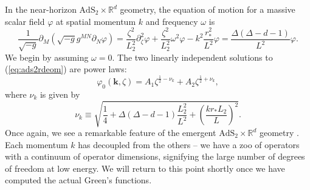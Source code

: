 \documentclass[10pt, oneside]{book}
\begin{document}
\begin{doublespace}
In the near-horizon $\mathrm{AdS}_2 \times \mathbb{R}^d$ geometry, the equation of motion for a massive scalar field $\varphi$ at spatial momentum $k$ and frequency $\omega$ is \begin{equation}
\frac{1}{\sqrt{-g}}\partial_M \left(\sqrt{-g}g^{MN} \partial_N\varphi\right) = \frac{\zeta^2}{L_2^2} \partial_\zeta^2 \varphi + \frac{\zeta^2}{L_2^2} \omega^2 \varphi - k^2 \frac{r_*^2}{L^2}\varphi = \frac{\Delta(\Delta-d-1)}{L^2}\varphi.  \label{eq:ads2rdeom}
\end{equation}
We begin by assuming $\omega=0$.   The two linearly independent solutions to (\ref{eq:ads2rdeom}) are power laws: \begin{equation}
\varphi_0(\mathbf{k},\zeta) = A_1 \zeta^{\frac{1}{2}-\nu_k} + A_2\zeta^{\frac{1}{2}+\nu_k},\label{eq:varphi0zeta}
\end{equation}
where $\nu_k$ is given by
\begin{equation}
\nu_k \equiv \sqrt{\frac{1}{4} + \Delta(\Delta-d-1)\frac{L_2^2}{L^2} + \left(\frac{kr_*L_2}{L}\right)^2 }.   \label{eq:nuk}
\end{equation}
Once again, we see a remarkable feature of the emergent $\mathrm{AdS}_2\times\mathbb{R}^d$ geometry  \cite{Faulkner:2009wj}.   Each momentum $k$ has decoupled from the others --  we have a zoo of operators with a continuum of operator dimensions, signifying the large number of degrees of freedom at low energy.  We will return to this point shortly once we have computed the actual Green's functions.



\end{doublespace}
\end{document}
